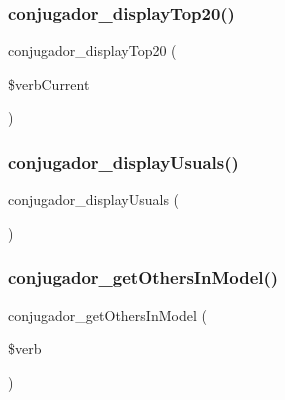 \subsubsection{\texorpdfstring{conjugador\+\_\+display\+Top20()}{conjugador\_displayTop20()}}
{\footnotesize\ttfamily conjugador\+\_\+display\+Top20 (\begin{DoxyParamCaption}\item[{}]{\$verb\+Current }\end{DoxyParamCaption})}

\hypertarget{conjoc__web_form_8inc_a1bfbce593ac5c763b1542fa713249aa3}{}\label{conjoc__web_form_8inc_a1bfbce593ac5c763b1542fa713249aa3} 
\subsubsection{\texorpdfstring{conjugador\+\_\+display\+Usuals()}{conjugador\_displayUsuals()}}
{\footnotesize\ttfamily conjugador\+\_\+display\+Usuals (\begin{DoxyParamCaption}{ }\end{DoxyParamCaption})}

\hypertarget{conjoc__web_form_8inc_a90ac7751a59eefed3b3576f1cedb016f}{}\label{conjoc__web_form_8inc_a90ac7751a59eefed3b3576f1cedb016f} 
\subsubsection{\texorpdfstring{conjugador\+\_\+get\+Others\+In\+Model()}{conjugador\_getOthersInModel()}}
{\footnotesize\ttfamily conjugador\+\_\+get\+Others\+In\+Model (\begin{DoxyParamCaption}\item[{}]{\$verb }\end{DoxyParamCaption})}

\hypertarget{conjoc__web_form_8inc_a9ab9dfc2c3015a0855c27f37812bb897}{}\label{conjoc__web_form_8inc_a9ab9dfc2c3015a0855c27f37812bb897} 
